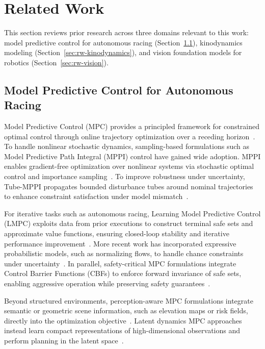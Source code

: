 \chapter{Related Work}
\label{sec:related-work}

This section reviews prior research across three domains relevant to this work: model predictive control for autonomous racing (Section~\ref{sec:rw-mpc}), kinodynamics modeling (Section~\ref{sec:rw-kinodynamics}), and vision foundation models for robotics (Section~\ref{sec:rw-vision}).

\section{Model Predictive Control for Autonomous Racing}
\label{sec:rw-mpc}

Model Predictive Control (MPC) provides a principled framework for constrained optimal control through online trajectory optimization over a receding horizon~\cite{MAYNE2000789}. To handle nonlinear stochastic dynamics, sampling-based formulations such as Model Predictive Path Integral (MPPI) control have gained wide adoption. MPPI enables gradient-free optimization over nonlinear systems via stochastic optimal control and importance sampling~\cite{williams2017model,williams2018information}. To improve robustness under uncertainty, Tube-MPPI propagates bounded disturbance tubes around nominal trajectories to enhance constraint satisfaction under model mismatch~\cite{williams2018robust}.

For iterative tasks such as autonomous racing, Learning Model Predictive Control (LMPC) exploits data from prior executions to construct terminal safe sets and approximate value functions, ensuring closed-loop stability and iterative performance improvement~\cite{rosolia2017learning}. More recent work has incorporated expressive probabilistic models, such as normalizing flows, to handle chance constraints under uncertainty~\cite{zang2025sit}. In parallel, safety-critical MPC formulations integrate Control Barrier Functions (CBFs) to enforce forward invariance of safe sets, enabling aggressive operation while preserving safety guarantees~\cite{ames2019control,hafner2019learning}.

Beyond structured environments, perception-aware MPC formulations integrate semantic or geometric scene information, such as elevation maps or risk fields, directly into the optimization objective~\cite{zhai2026pa,xiao2022learning}. Latent dynamics MPC approaches instead learn compact representations of high-dimensional observations and perform planning in the latent space~\cite{hafner2019learning}.

